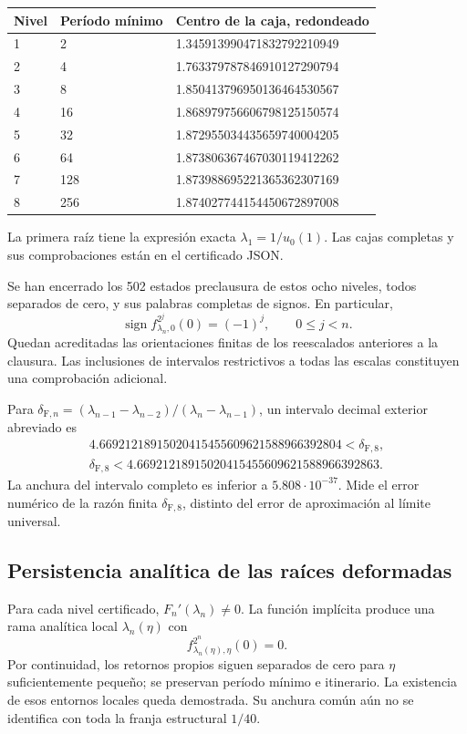 \begingroup\small
\begin{longtable}{p{.12\linewidth}p{.17\linewidth}p{.62\linewidth}}
\hline
Nivel & Período mínimo & Centro de la caja, redondeado \\
\hline
1 & 2 & 1.345913990471832792210949 \\
2 & 4 & 1.763379787846910127290794 \\
3 & 8 & 1.850413796950136464530567 \\
4 & 16 & 1.868979756606798125150574 \\
5 & 32 & 1.872955034435659740004205 \\
6 & 64 & 1.873806367467030119412262 \\
7 & 128 & 1.873988695221365362307169 \\
8 & 256 & 1.874027744154450672897008 \\
\hline\end{longtable}
\endgroup

La primera raíz tiene la expresión exacta \(\lambda_1=1/u_0(1)\). Las cajas completas y sus comprobaciones están en el certificado JSON.

Se han encerrado los 502 estados preclausura de estos ocho niveles, todos separados de cero, y sus palabras completas de signos. En particular,
\[
\operatorname{sign}f_{\lambda_n,0}^{2^j}(0)=(-1)^j,\qquad0\le j<n.
\]
Quedan acreditadas las orientaciones finitas de los reescalados anteriores a la clausura. Las inclusiones de intervalos restrictivos a todas las escalas constituyen una comprobación adicional.

Para \(\delta_{\mathrm F,n}=(\lambda_{n-1}-\lambda_{n-2})/(\lambda_n-\lambda_{n-1})\), un intervalo decimal exterior abreviado es
\[
\boxed{\begin{gathered}
4.66921218915020415455609621588966392804<\delta_{\mathrm F,8},\\
\delta_{\mathrm F,8}<4.66921218915020415455609621588966392863.
\end{gathered}}
\]
La anchura del intervalo completo es inferior a \(5.808\cdot10^{-37}\). Mide el error numérico de la razón finita \(\delta_{\mathrm F,8}\), distinto del error de aproximación al límite universal.


\subsection{Persistencia analítica de las raíces deformadas}
\label{hmtfg:desarrollo:8}

Para cada nivel certificado, \(F_n'(\lambda_n)\ne0\). La función implícita produce una rama analítica local \(\lambda_n(\eta)\) con
\[
f_{\lambda_n(\eta),\eta}^{2^n}(0)=0.
\]
Por continuidad, los retornos propios siguen separados de cero para \(\eta\) suficientemente pequeño; se preservan período mínimo e itinerario. La existencia de esos entornos locales queda demostrada. Su anchura común aún no se identifica con toda la franja estructural \(1/40\).

